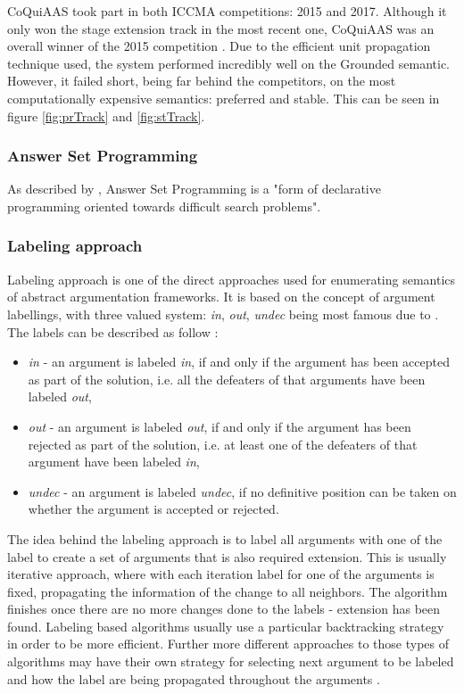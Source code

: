 CoQuiAAS took part in both ICCMA competitions: 2015 and 2017. Although it only won the stage extension track in the most recent one, CoQuiAAS was an overall winner of the 2015 competition \citep{iccma2015}. Due to the efficient unit propagation technique used, the system performed incredibly well on the Grounded semantic. However, it failed short, being far behind the competitors, on the most computationally expensive semantics: preferred and stable. This can be seen in figure \ref{fig:prTrack} and \ref{fig:stTrack}.

\subsubsection{Answer Set Programming}
As described by \citet{asp}, Answer Set Programming is a "form of declarative programming oriented towards difficult search problems".


\subsubsection{Labeling approach}
Labeling approach is one of the direct approaches used for enumerating semantics of abstract argumentation frameworks. It is based on the concept of argument labellings, with three valued system: \textit{in}, \textit{out}, \textit{undec} being most famous due to \citet{caminadaLabeling}. The labels can be described as follow \citep{caminada2008gentle}:

\begin{itemize}
	\item \textit{in} - an argument is labeled \textit{in}, if and only if the argument has been accepted as part of the solution, i.e. all the defeaters of that arguments have been labeled \textit{out},
	\item \textit{out} - an argument is labeled \textit{out}, if and only if the argument has been rejected as part of the solution, i.e. at least one of the defeaters of that argument have been labeled \textit{in},
	\item \textit{undec} - an argument is labeled \textit{undec}, if no definitive position can be taken on whether the argument is accepted or rejected.
\end{itemize}

The idea behind the labeling approach is to label all arguments with one of the label to create a set of arguments that is also required extension. This is usually iterative approach, where with each iteration label for one of the arguments is fixed, propagating the information of the change to all neighbors. The algorithm finishes once there are no more changes done to the labels - extension has been found. Labeling based algorithms usually use a particular backtracking strategy in order to be more efficient. Further more different approaches to those types of algorithms may have their own strategy for selecting next argument to be labeled and how the label are being propagated throughout the arguments \citep{solvingMethods}.

